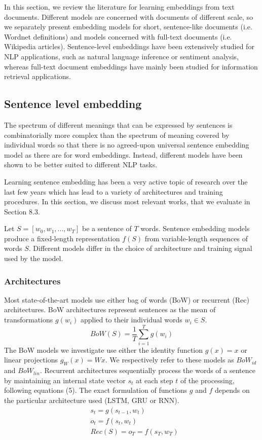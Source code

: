 In this section, we review the literature for learning embeddings from text documents. Different models are concerned with documents of different scale, so we separately present embedding models for short, sentence-like documents (i.e. Wordnet definitions) and models concerned with full-text documents (i.e. Wikipedia articles). Sentence-level embeddings have been extensively studied for NLP applications, such as natural language inference or sentiment analysis, whereas full-text document embeddings have mainly been studied for information retrieval applications.
\subsection{ Sentence level embedding}
The spectrum of different meanings that can be expressed by sentences is combinatorially more complex than the spectrum of meaning covered by individual words so that there is no agreed-upon universal sentence embedding model as there are for word embeddings. Instead, different models have been shown to be better suited to different NLP tasks. 

Learning sentence embedding has been a very active topic of research over the last few years which has lead to a variety of architectures and training procedures. In this section, we discuss most relevant works, that we evaluate in Section 8.3. 

Let $S=[w_0, w_1, ..., w_T]$ be a sentence of $T$ words. Sentence embedding models produce a fixed-length representation $f(S)$ from variable-length sequences of words $S$. Different models differ in the choice of architecture and training signal used by the model. 
\subsubsection{ Architectures}
Most state-of-the-art models use either bag of words (BoW) or recurrent (Rec) architectures. BoW architectures represent sentences as the mean of transformations $g(w_i)$ applied to their individual words $w_i \in S$.
\begin{equation} 
BoW(S) = \frac{1}{T} \sum_{i=1}^T g(w_i)
\end{equation} 
The BoW models we investigate use either the identity function $g(x)=x$ or linear projections $g_W(x)=Wx$. We respectively refer to these models as $BoW_{id}$ and  $BoW_{lin}$. Recurrent architectures sequentially process the words of a sentence by maintaining an internal state vector $s_t$ at each step $t$ of the processing, following equations (5). The exact formulation of functions $g$ and $f$ depends on the particular architecture used (LSTM, GRU or RNN).
\begin{subequations} 
\begin{align}
&s_{t} = g(s_{t-1}, w_t) \\
&o_{t} = f(s_t, w_t) \\
&Rec(S)  = o_{T} = f(s_{T}, w_{T})
\end{align}
\end{subequations} 
